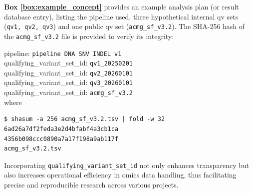 \textbf{Box \ref{box:example_concept}} provides an example analysis plan (or result database entry), listing the pipeline used, three hypothetical internal \ac{qv} sets (\texttt{qv1, qv2, qv3}) and one public \ac{qv} set (\texttt{acmg\_sf\_v3.2}). The SHA-256 hash of the \texttt{acmg\_sf\_v3.2} file is provided to verify its integrity:
\begin{tcolorbox}[
    colback=white!0,
    colframe=black,
    boxrule=1pt,
    arc=1mm,
    outer arc=1mm,
    title=\textbf{\refstepcounter{myboxcounter}\label{box:example_concept}Box \themyboxcounter: Example implementation of QV Set ID}
]
pipeline: \colorbox{colorSUNSET1!30}{\texttt{pipeline DNA SNV INDEL v1}}\\
qualifying\_variant\_set\_id: \colorbox{colorSUNSET2!60}{\texttt{qv1\_20250201}}\\
qualifying\_variant\_set\_id: \colorbox{colorSUNSET2!60}{\texttt{qv2\_20260101}}\\
qualifying\_variant\_set\_id: \colorbox{colorSUNSET2!60}{\texttt{qv3\_20260101}}\\
qualifying\_variant\_set\_id: \colorbox{colorSUNSET2!60}{\texttt{acmg\_sf\_v3.2}}\\

where 
\begin{verbatim}
$ shasum -a 256 acmg_sf_v3.2.tsv | fold -w 32
6ad26a7df2feda3e2d4bfabf4a3cb1ca
4356b098ccc0890a7a17f198a9ab117f
acmg_sf_v3.2.tsv
\end{verbatim}
\end{tcolorbox}

Incorporating \texttt{qualifying\_variant\_set\_id} not only enhances transparency but also increases operational efficiency in omics data handling, thus facilitating precise and reproducible research across various projects.



